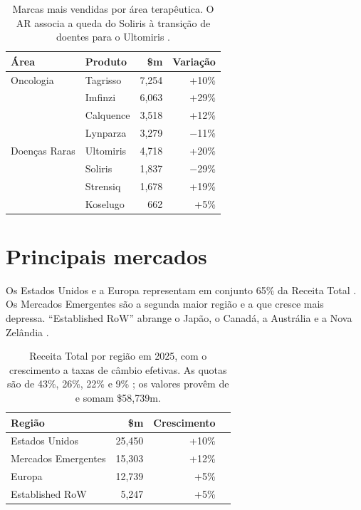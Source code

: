 \begin{table}[H]\centering
\caption{Marcas mais vendidas por área terapêutica. O AR associa a queda do Soliris à transição de doentes para o Ultomiris \cite[pp.~24, 56]{AR}.}
\label{tab:marcas}
\begin{tabular}{@{}llrr@{}}
\toprule
\textbf{Área} & \textbf{Produto} & \textbf{\$m} & \textbf{Variação} \\
\midrule
Oncologia \cite[p.~13]{AR}      & Tagrisso  & 7,254 & +10\% \\
                                & Imfinzi   & 6,063 & +29\% \\
                                & Calquence & 3,518 & +12\% \\
                                & Lynparza  & 3,279 & $-$11\% \\
\addlinespace
Doenças Raras \cite[p.~23]{AR}  & Ultomiris & 4,718 & +20\% \\
                                & Soliris   & 1,837 & $-$29\% \\
                                & Strensiq  & 1,678 & +19\% \\
                                & Koselugo  &   662 &  +5\% \\
\bottomrule
\end{tabular}
\end{table}
\section{Principais mercados}

Os Estados Unidos e a Europa representam em conjunto 65\% da Receita Total \cite[p.~2]{AR}. Os Mercados Emergentes são a segunda maior região e a que cresce mais depressa. ``Established RoW'' abrange o Japão, o Canadá, a Austrália e a Nova Zelândia \cite[p.~33]{AR}.

\begin{table}[H]\centering
\caption{Receita Total por região em 2025, com o crescimento a taxas de câmbio efetivas. As quotas são de 43\%, 26\%, 22\% e 9\% \cite[p.~2]{AR}; os valores provêm de \cite[p.~32]{AR} e somam \$58,739m.}
\label{tab:receita-regiao}
\begin{tabular}{@{}lrrB@{}}
\toprule
\textbf{Região} & \textbf{\$m} & \textbf{Crescimento} & \\
\midrule
Estados Unidos      & 25,450 & +10\% &  \\
Mercados Emergentes & 15,303 & +12\% &  \\
Europa              & 12,739 &  +5\% &  \\
Established RoW     &  5,247 &  +5\% &  \\
\bottomrule
\end{tabular}
\end{table}
